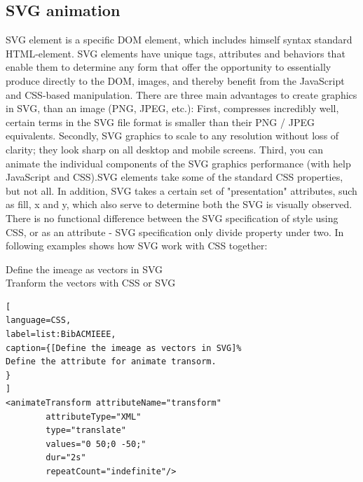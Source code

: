 \subsection{SVG animation } %
SVG element is a specific DOM element, which includes himself syntax standard HTML-element. SVG elements have unique tags, attributes and behaviors that enable them to determine any form that offer the opportunity to essentially produce directly to the DOM, images, and thereby benefit from the JavaScript and CSS-based manipulation. There are three main advantages to create graphics in SVG, than an image (PNG, JPEG, etc.): First, compresses incredibly well, certain terms in the SVG file format is smaller than their PNG / JPEG equivalents. Secondly, SVG graphics to scale to any resolution without loss of clarity; they look sharp on all desktop and mobile screens. Third, you can animate the individual components of the SVG graphics performance (with help JavaScript and CSS).SVG elements take some of the standard CSS properties, but not all. In addition, SVG takes a certain set of "presentation" attributes, such as fill, x and y, which also serve to determine both the SVG is visually observed. There is no functional difference between the SVG specification of style using CSS, or as an attribute - SVG specification only divide property under two. In following examples shows how SVG work with CSS together:
\begin{description}
\item [Define the imeage as vectors in SVG]
\item [Tranform the vectors with CSS or SVG]
\end{description}
\begin{lstlisting}[
language=CSS,
label=list:BibACMIEEE,
caption={[Define the imeage as vectors in SVG]%
Define the attribute for animate transorm.
}
]
<animateTransform attributeName="transform"
		attributeType="XML"
		type="translate"
		values="0 50;0 -50;"
		dur="2s"
		repeatCount="indefinite"/>

\end{lstlisting}
\label{list:animateTransorm}
